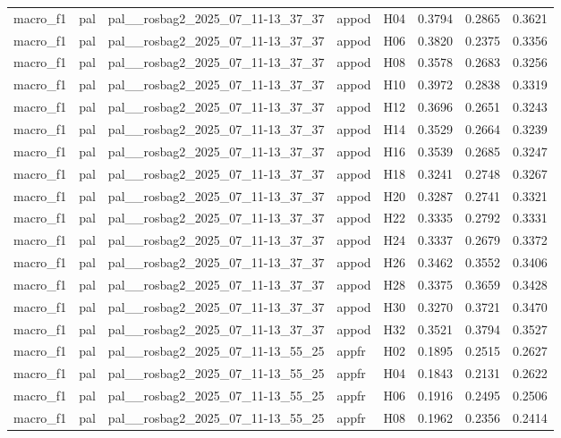 \begin{table}[tbp]
\begin{tabular}{lllllrrr}
macro\_f1 & pal & pal\_\_rosbag2\_2025\_07\_11-13\_37\_37 & appod & H04 & 0.3794 & 0.2865 & 0.3621 \\
macro\_f1 & pal & pal\_\_rosbag2\_2025\_07\_11-13\_37\_37 & appod & H06 & 0.3820 & 0.2375 & 0.3356 \\
macro\_f1 & pal & pal\_\_rosbag2\_2025\_07\_11-13\_37\_37 & appod & H08 & 0.3578 & 0.2683 & 0.3256 \\
macro\_f1 & pal & pal\_\_rosbag2\_2025\_07\_11-13\_37\_37 & appod & H10 & 0.3972 & 0.2838 & 0.3319 \\
macro\_f1 & pal & pal\_\_rosbag2\_2025\_07\_11-13\_37\_37 & appod & H12 & 0.3696 & 0.2651 & 0.3243 \\
macro\_f1 & pal & pal\_\_rosbag2\_2025\_07\_11-13\_37\_37 & appod & H14 & 0.3529 & 0.2664 & 0.3239 \\
macro\_f1 & pal & pal\_\_rosbag2\_2025\_07\_11-13\_37\_37 & appod & H16 & 0.3539 & 0.2685 & 0.3247 \\
macro\_f1 & pal & pal\_\_rosbag2\_2025\_07\_11-13\_37\_37 & appod & H18 & 0.3241 & 0.2748 & 0.3267 \\
macro\_f1 & pal & pal\_\_rosbag2\_2025\_07\_11-13\_37\_37 & appod & H20 & 0.3287 & 0.2741 & 0.3321 \\
macro\_f1 & pal & pal\_\_rosbag2\_2025\_07\_11-13\_37\_37 & appod & H22 & 0.3335 & 0.2792 & 0.3331 \\
macro\_f1 & pal & pal\_\_rosbag2\_2025\_07\_11-13\_37\_37 & appod & H24 & 0.3337 & 0.2679 & 0.3372 \\
macro\_f1 & pal & pal\_\_rosbag2\_2025\_07\_11-13\_37\_37 & appod & H26 & 0.3462 & 0.3552 & 0.3406 \\
macro\_f1 & pal & pal\_\_rosbag2\_2025\_07\_11-13\_37\_37 & appod & H28 & 0.3375 & 0.3659 & 0.3428 \\
macro\_f1 & pal & pal\_\_rosbag2\_2025\_07\_11-13\_37\_37 & appod & H30 & 0.3270 & 0.3721 & 0.3470 \\
macro\_f1 & pal & pal\_\_rosbag2\_2025\_07\_11-13\_37\_37 & appod & H32 & 0.3521 & 0.3794 & 0.3527 \\
macro\_f1 & pal & pal\_\_rosbag2\_2025\_07\_11-13\_55\_25 & appfr & H02 & 0.1895 & 0.2515 & 0.2627 \\
macro\_f1 & pal & pal\_\_rosbag2\_2025\_07\_11-13\_55\_25 & appfr & H04 & 0.1843 & 0.2131 & 0.2622 \\
macro\_f1 & pal & pal\_\_rosbag2\_2025\_07\_11-13\_55\_25 & appfr & H06 & 0.1916 & 0.2495 & 0.2506 \\
macro\_f1 & pal & pal\_\_rosbag2\_2025\_07\_11-13\_55\_25 & appfr & H08 & 0.1962 & 0.2356 & 0.2414 \\

\end{tabular}
\end{table}
